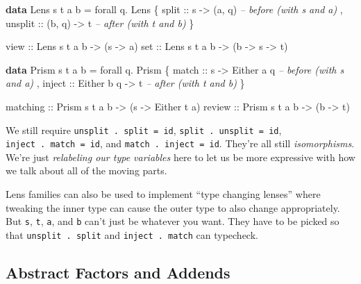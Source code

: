 \documentclass[]{article}
\newenvironment{Shaded}{}{}
\newcommand{\CommentTok}[1]{\textcolor[rgb]{0.38,0.63,0.69}{\textit{#1}}}
\newcommand{\DataTypeTok}[1]{\textcolor[rgb]{0.56,0.13,0.00}{#1}}
\newcommand{\FunctionTok}[1]{\textcolor[rgb]{0.02,0.16,0.49}{#1}}
\newcommand{\KeywordTok}[1]{\textcolor[rgb]{0.00,0.44,0.13}{\textbf{#1}}}
\newcommand{\NormalTok}[1]{#1}
\newcommand{\OtherTok}[1]{\textcolor[rgb]{0.00,0.44,0.13}{#1}}
\begin{document}
\begin{Shaded}
\begin{Highlighting}[]
\KeywordTok{data} \DataTypeTok{Lens}\NormalTok{ s t a b }\FunctionTok{=}\NormalTok{ forall q}\FunctionTok{.} \DataTypeTok{Lens}
\NormalTok{    \{}\OtherTok{ split   ::}\NormalTok{ s }\OtherTok{->}\NormalTok{ (a, q)        }\CommentTok{-- before (with s and a)}
\NormalTok{    ,}\OtherTok{ unsplit ::}\NormalTok{ (b, q) }\OtherTok{->}\NormalTok{ t        }\CommentTok{-- after  (with t and b)}
\NormalTok{    \}}

\OtherTok{view ::} \DataTypeTok{Lens}\NormalTok{ s t a b }\OtherTok{->}\NormalTok{ (s }\OtherTok{->}\NormalTok{ a)}
\OtherTok{set  ::} \DataTypeTok{Lens}\NormalTok{ s t a b }\OtherTok{->}\NormalTok{ (b }\OtherTok{->}\NormalTok{ s }\OtherTok{->}\NormalTok{ t)}

\KeywordTok{data} \DataTypeTok{Prism}\NormalTok{ s t a b }\FunctionTok{=}\NormalTok{ forall q}\FunctionTok{.} \DataTypeTok{Prism}
\NormalTok{    \{}\OtherTok{ match  ::}\NormalTok{ s }\OtherTok{->} \DataTypeTok{Either}\NormalTok{ a q     }\CommentTok{-- before (with s and a)}
\NormalTok{    ,}\OtherTok{ inject ::} \DataTypeTok{Either}\NormalTok{ b q }\OtherTok{->}\NormalTok{ t     }\CommentTok{-- after  (with t and b)}
\NormalTok{    \}}

\OtherTok{matching ::} \DataTypeTok{Prism}\NormalTok{ s t a b }\OtherTok{->}\NormalTok{ (s }\OtherTok{->} \DataTypeTok{Either}\NormalTok{ t a)}
\OtherTok{review   ::} \DataTypeTok{Prism}\NormalTok{ s t a b }\OtherTok{->}\NormalTok{ (b }\OtherTok{->}\NormalTok{ t)}
\end{Highlighting}
\end{Shaded}

We still require \texttt{unsplit\ .\ split\ =\ id},
\texttt{split\ .\ unsplit\ =\ id}, \texttt{inject\ .\ match\ =\ id}, and
\texttt{match\ .\ inject\ =\ id}. They're all still \emph{isomorphisms}. We're
just \emph{relabeling our type variables} here to let us be more expressive with
how we talk about all of the moving parts.

Lens families can also be used to implement ``type changing lenses'' where
tweaking the inner type can cause the outer type to also change appropriately.
But \texttt{s}, \texttt{t}, \texttt{a}, and \texttt{b} can't just be whatever
you want. They have to be picked so that \texttt{unsplit\ .\ split} and
\texttt{inject\ .\ match} can typecheck.

\hypertarget{abstract-factors-and-addends}{%
\subsection{Abstract Factors and Addends}\label{abstract-factors-and-addends}}
\end{document}
